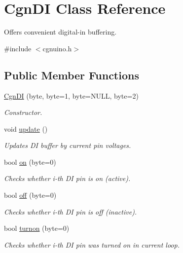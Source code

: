 \hypertarget{classCgnDI}{}\section{Cgn\+DI Class Reference}
\label{classCgnDI}


Offers convenient digital-\/in buffering.  




{\ttfamily \#include $<$cgnuino.\+h$>$}

\subsection*{Public Member Functions}
\begin{DoxyCompactItemize}
\item 
\hyperlink{classCgnDI_a65c74487fcfa1f0073476ac6d1e7fc24}{Cgn\+DI} (byte, byte=1, byte=N\+U\+LL, byte=2)
\begin{DoxyCompactList}\small\item\em Constructor. \end{DoxyCompactList}\item 
void \hyperlink{classCgnDI_a95e8d70a404b9d6b05c562cc293ec39c}{update} ()
\begin{DoxyCompactList}\small\item\em Updates DI buffer by current pin voltages. \end{DoxyCompactList}\item 
bool \hyperlink{classCgnDI_a6aa03d3373b19a730ebe60c63102e2de}{on} (byte=0)
\begin{DoxyCompactList}\small\item\em Checks whether {\itshape i-\/th} DI pin is on (active). \end{DoxyCompactList}\item 
bool \hyperlink{classCgnDI_a398a749f1f599f8c2076be7b8ea0f1c0}{off} (byte=0)
\begin{DoxyCompactList}\small\item\em Checks whether {\itshape i-\/th} DI pin is off (inactive). \end{DoxyCompactList}\item 
bool \hyperlink{classCgnDI_ab177debb1d0d973696230aeabf478b53}{turnon} (byte=0)
\begin{DoxyCompactList}\small\item\em Checks whether {\itshape i-\/th} DI pin was turned on in current loop. \end{DoxyCompactList}\item 

\end{DoxyCompactItemize}
